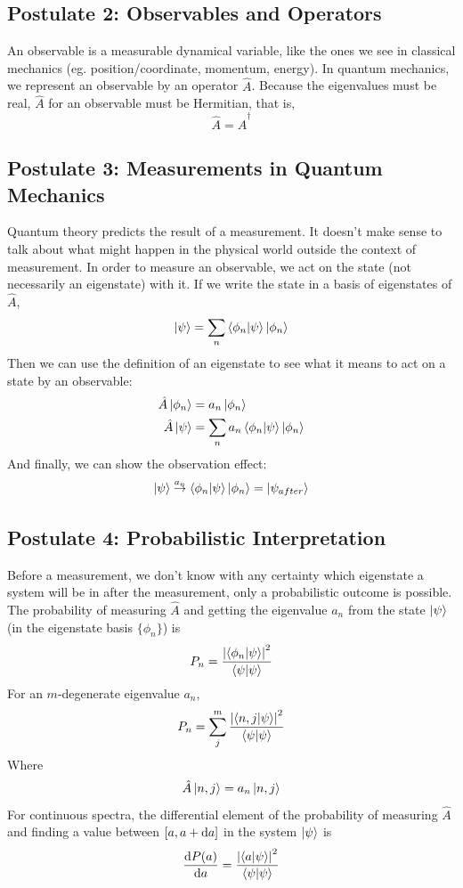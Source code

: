 \documentclass[a4paper]{article}
\begin{document}
\subsection{Postulate 2: Observables and Operators}
An observable is a measurable dynamical variable, like the ones we see in
classical mechanics (eg. position/coordinate, momentum, energy). In quantum
mechanics, we represent an observable by an operator $\hat{A}$. Because the
eigenvalues must be real,
$\hat{A}$ for an observable must be Hermitian, that is,
\[ \hat{A} = \hat{A}^\dagger \]

\subsection{Postulate 3: Measurements in Quantum Mechanics}
Quantum theory predicts the result of a measurement. It doesn't make sense to
talk about what might happen in the physical world outside the context of
measurement.
In order to measure an observable, we act on the state (not necessarily an
eigenstate) with it. If we write the state in a basis of eigenstates
of $\hat{A}$,
\[ \left\lvert \psi\right\rangle = \sum_n\left\langle \phi_n\middle\vert \psi \right\rangle\left\lvert \phi_n\right\rangle \]
Then we can use the definition of an eigenstate to see what it means to act
on a state by an observable:
\begin{align*}
	\hat{A}\left\lvert \phi_n\right\rangle &= a_n\left\lvert \phi_n\right\rangle\\
	\hat{A}\left\lvert \psi\right\rangle &= \sum_n a_n\left\langle \phi_n\middle\vert \psi \right\rangle\left\lvert \phi_n\right\rangle\\
\end{align*}
And finally, we can show the observation effect:
\[
	\left\lvert \psi\right\rangle \overset{a_n}{\to} \left\langle \phi_n\middle\vert \psi \right\rangle\left\lvert \phi_n\right\rangle =
	\left\lvert \psi_{after}\right\rangle
\]

\subsection{Postulate 4: Probabilistic Interpretation}
Before a measurement, we don't know with any certainty which eigenstate a
system will be in after the measurement, only a probabilistic outcome is
possible. The probability of measuring $\hat{A}$ and getting the eigenvalue
$a_n$ from the state $\left\lvert \psi\right\rangle$ (in the eigenstate basis $\{\phi_n\}$) is
\[ P_n = \frac{\left\lvert \left\langle \phi_n\middle\vert \psi \right\rangle\right\rvert^2}{\left\langle \psi\middle\vert \psi \right\rangle} \]
For an $m$-degenerate eigenvalue $a_n$,
\[ P_n = \sum_j^m \frac{\left\lvert \left\langle n,j\middle\vert \psi \right\rangle\right\rvert^2}{\left\langle \psi\middle\vert \psi \right\rangle} \]
Where
\[ \hat{A}\left\lvert n,j\right\rangle = a_n\left\lvert n,j\right\rangle \]
For continuous spectra, the differential element of the probability of
measuring $\hat{A}$ and finding a value between $[a,a+\mathrm{d} a]$ in the system
$\left\lvert \psi\right\rangle$ is
\[ \frac{\mathrm{d} P(a)}{\mathrm{d} a} = \frac{\left\lvert \left\langle a\middle\vert \psi \right\rangle\right\rvert^2}{\left\langle \psi\middle\vert \psi \right\rangle}\]
\end{document}
